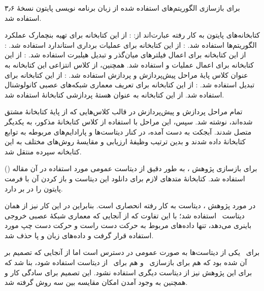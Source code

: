برای بازسازی الگوریتم‌های استفاده شده از زبان برنامه نویسی پایتون نسخهٔ ۳٫۶ استفاده شد.

کتابخانه‌های پایتون به کار رفته عبارت‌اند از:
 : از این کتابخانه برای تهیه بنچمارک عملکرد الگوریتم‌ها استفاده شد.
 : از این کتابخانه برای عملیات برداری استاندارد استفاده شد.
 : از این کتابخانه برای اعمال فیلترهای میان‌گذر و تبدیل هیلبرت استفاده شد.
 : از این کتابخانه برای اعمال عملیات  و  استفاده شد. همچنین، از کلاس انتزاعی  این کتابخانه به عنوان کلاس پایهٔ مراحل پیش‌پردازش و پردازش استفاده شد.
 : از این کتابخانه برای تبدیل  استفاده شد.
 : از این کتابخانه برای تعریف معماری شبکه‌های عصبی کانولوشنال استفاده شد.
  از این کتابخانه به عنوان هستهٔ پردازشی کتابخانهٔ  استفاده شد.

تمام مراحل پردازش و پیش‌پردازش در قالب کلاس‌هایی که از پایهٔ  کتابخانهٔ  مشتق شده‌اند، نوشته شد. سپس، این مراحل با استفاده از کلاس  کتابخانهٔ مذکور، به یکدیگر متصل شدند. آبجکت  به دست آمده، در کنار دیتاست‌ها و پارادایم‌های مربوطه به توابع  کتابخانهٔ  داده شدند و بدین ترتیب وظیفهٔ ارزیابی و مقایسهٔ روش‌های مختلف به این کتابخانه سپرده منتقل شد.

برای بازسازی پژوهش \آ، به طور دقیق از دیتاست عمومی مورد استفاده در آن مقاله () استفاده شد. کتابخانهٔ  متدهای لازم برای دانلود این دیتاست و باز کردن آن با فرمت پایتون را در بر دارد.

در مورد پژوهش \ب، دیتاست به کار رفته انحصاری است. بنابراین در این کار نیز از همان دیتاست \آ\ استفاده شد؛ با این تفاوت که از آنجایی که معماری شبکهٔ عصبی خروجی باینری می‌دهد، تنها داده‌های مربوط به حرکت دست راست و حرکت دست چپ مورد استفاده قرار گرفت و داده‌های زبان و پا حذف شد.

برای \پ\ یکی از دیتاست‌ها به صورت عمومی در دسترس است اما از آنجایی که تصمیم بر آن شده بود که هم برای بازسازی \آ\ و هم برای \ب\ از دیتاست  استفاده شود، بنا شد که برای این پژوهش نیز از دیتاست دیگری استفاده نشود. این تصمیم برای سادگی کار و همچنین به وجود آمدن امکان مقایسه بین سه روش گرفته شد.


